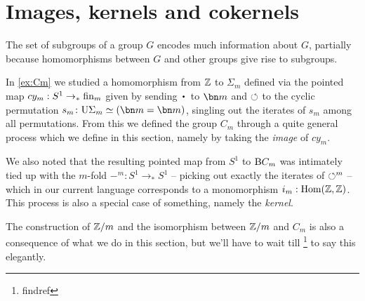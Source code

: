 \section{Images, kernels and cokernels}
\label{subsec:ker}

The set of subgroups of a group $G$ encodes much information about $G$, partially because homomorphisms between $G$ and other groups give rise to subgroups.

In \cref{ex:Cm} we studied a homomorphism from $\mathbb{Z}$ to $\Sigma_m$ defined via the pointed map $cy_m:S^1\to_*\fin_m$ given by sending $\base$ to $\bn m$ and 
$\circlearrowleft$ to the cyclic permutation $s_m\colon\USym\Sigma_m\oldequiv(\bn m=\bn m)$, singling out the iterates of $s_m$ among all permutations.  From this we defined the group $C_m$ through a quite general process which we define in this section, namely by taking the \emph{image} of $cy_m$.

We also noted that the resulting pointed map from $S^1$ to $\mathrm{B} C_m$ was intimately tied up with the $m$-fold \covering $-^m:S^1\to_*S^1$ -- picking out exactly the iterates of $\circlearrowleft^m$ -- which in our current language corresponds to a monomorphism $i_m:\Hom(\ZZ,\ZZ)$. This process is also a special case of something, namely the \emph{kernel}.

The construction of $\mathbb{Z}/m$ and the isomorphism between $\mathbb{Z}/m$ and $C_m$ is also a consequence of what we do in this section, but we'll have to wait till \footnote{findref} to say this elegantly.




